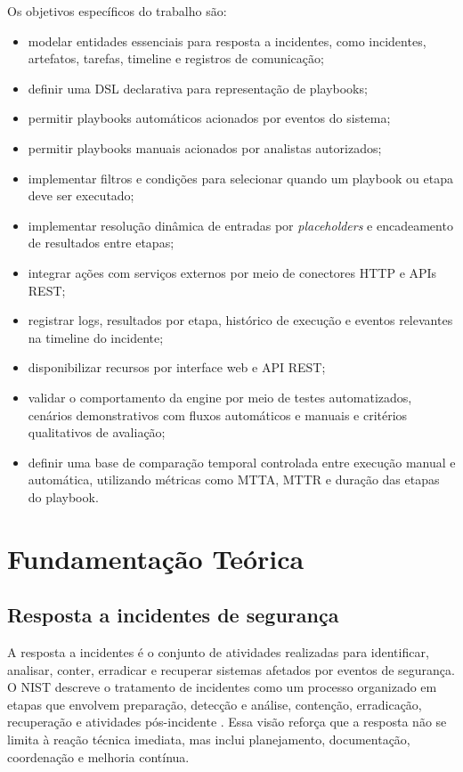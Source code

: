 \documentclass[article,a4paper,12pt,english,brazil,sumario=tradicional]{abntex2}
\begin{document}
Os objetivos específicos do trabalho são:

\begin{itemize}
    \item modelar entidades essenciais para resposta a incidentes, como incidentes, artefatos, tarefas, timeline e registros de comunicação;
    \item definir uma DSL declarativa para representação de playbooks;
    \item permitir playbooks automáticos acionados por eventos do sistema;
    \item permitir playbooks manuais acionados por analistas autorizados;
    \item implementar filtros e condições para selecionar quando um playbook ou etapa deve ser executado;
    \item implementar resolução dinâmica de entradas por \textit{placeholders} e encadeamento de resultados entre etapas;
    \item integrar ações com serviços externos por meio de conectores HTTP e APIs REST;
    \item registrar logs, resultados por etapa, histórico de execução e eventos relevantes na timeline do incidente;
    \item disponibilizar recursos por interface web e API REST;
    \item validar o comportamento da engine por meio de testes automatizados, cenários demonstrativos com fluxos automáticos e manuais e critérios qualitativos de avaliação;
    \item definir uma base de comparação temporal controlada entre execução manual e automática, utilizando métricas como MTTA, MTTR e duração das etapas do playbook.
\end{itemize}

\section{Fundamentação Teórica}

\subsection{Resposta a incidentes de segurança}

A resposta a incidentes é o conjunto de atividades realizadas para identificar, analisar, conter, erradicar e recuperar sistemas afetados por eventos de segurança. O NIST descreve o tratamento de incidentes como um processo organizado em etapas que envolvem preparação, detecção e análise, contenção, erradicação, recuperação e atividades pós-incidente \cite{nist2012}. Essa visão reforça que a resposta não se limita à reação técnica imediata, mas inclui planejamento, documentação, coordenação e melhoria contínua.
\end{document}

